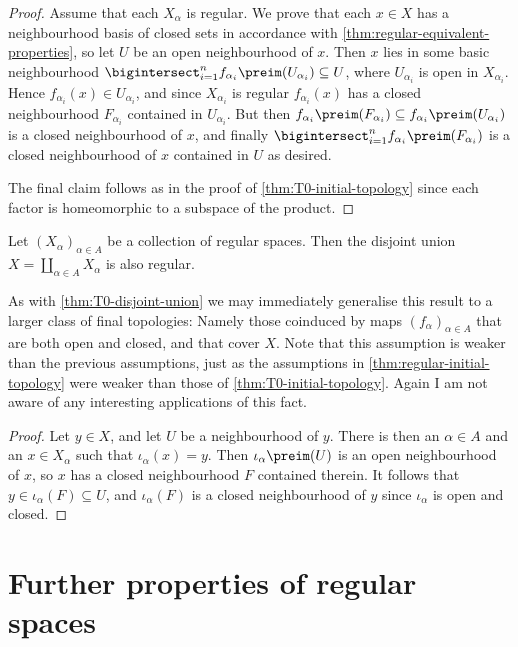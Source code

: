 \documentclass[article, a4paper, 11pt, oneside]{memoir}
\numberwithin{equation}{chapter}
\begin{document}
\begin{proof}
    Assume that each $X_\alpha$ is regular. We prove that each $x \in X$ has a neighbourhood basis of closed sets in accordance with \cref{thm:regular-equivalent-properties}, so let $U$ be an open neighbourhood of $x$. Then $x$ lies in some basic neighbourhood $\bigintersect_{i=1}^n f_{\alpha_i}\preim(U_{\alpha_i}) \subseteq U$, where $U_{\alpha_i}$ is open in $X_{\alpha_i}$. Hence $f_{\alpha_i}(x) \in U_{\alpha_i}$, and since $X_{\alpha_i}$ is regular $f_{\alpha_i}(x)$ has a closed neighbourhood $F_{\alpha_i}$ contained in $U_{\alpha_i}$. But then $f_{\alpha_i}\preim(F_{\alpha_i}) \subseteq f_{\alpha_i}\preim(U_{\alpha_i})$ is a closed neighbourhood of $x$, and finally $\bigintersect_{i=1}^n f_{\alpha_i}\preim(F_{\alpha_i})$ is a closed neighbourhood of $x$ contained in $U$ as desired.

    The final claim follows as in the proof of \cref{thm:T0-initial-topology} since each factor is homeomorphic to a subspace of the product.
\end{proof}


\begin{proposition}
    Let $(X_\alpha)_{\alpha \in A}$ be a collection of regular spaces. Then the disjoint union $X = \coprod_{\alpha \in A} X_\alpha$ is also regular. %
\end{proposition}
%
As with \cref{thm:T0-disjoint-union} we may immediately generalise this result to a larger class of final topologies: Namely those coinduced by maps $(f_\alpha)_{\alpha \in A}$ that are both open and closed, and that cover $X$. Note that this assumption is weaker than the previous assumptions, just as the assumptions in \cref{thm:regular-initial-topology} were weaker than those of \cref{thm:T0-initial-topology}. Again I am not aware of any interesting applications of this fact.

\begin{proof}
    Let $y \in X$, and let $U$ be a neighbourhood of $y$. There is then an $\alpha \in A$ and an $x \in X_\alpha$ such that $\iota_\alpha(x) = y$. Then $\iota_\alpha\preim(U)$ is an open neighbourhood of $x$, so $x$ has a closed neighbourhood $F$ contained therein. It follows that $y \in \iota_\alpha(F) \subseteq U$, and $\iota_\alpha(F)$ is a closed neighbourhood of $y$ since $\iota_\alpha$ is open and closed.
\end{proof}


\section{Further properties of regular spaces}
\end{document}

